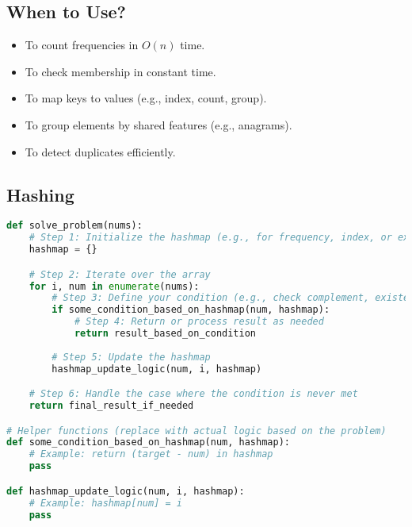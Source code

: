 \subsection{When to Use?}
\begin{summary}
    \begin{itemize}
        \item To count frequencies in \( O(n) \) time.
        \item To check membership in constant time.
        \item To map keys to values (e.g., index, count, group).
        \item To group elements by shared features (e.g., anagrams).
        \item To detect duplicates efficiently.
    \end{itemize}
\end{summary}

\subsection{Hashing}
\begin{algo}
\begin{lstlisting}[language=Python, caption=General Hashing Pattern]
def solve_problem(nums):
    # Step 1: Initialize the hashmap (e.g., for frequency, index, or existence check)
    hashmap = {}

    # Step 2: Iterate over the array
    for i, num in enumerate(nums):
        # Step 3: Define your condition (e.g., check complement, existence, frequency)
        if some_condition_based_on_hashmap(num, hashmap):
            # Step 4: Return or process result as needed
            return result_based_on_condition
        
        # Step 5: Update the hashmap
        hashmap_update_logic(num, i, hashmap)

    # Step 6: Handle the case where the condition is never met
    return final_result_if_needed

# Helper functions (replace with actual logic based on the problem)
def some_condition_based_on_hashmap(num, hashmap):
    # Example: return (target - num) in hashmap
    pass

def hashmap_update_logic(num, i, hashmap):
    # Example: hashmap[num] = i
    pass
\end{lstlisting}
\end{algo}
\newpage

